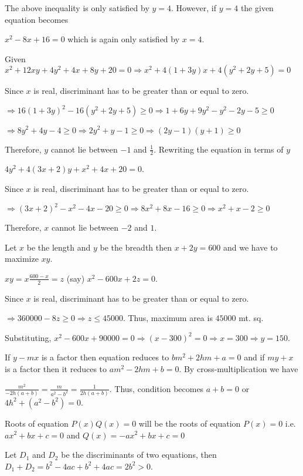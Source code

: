   The above inequality is only satisfied by $y = 4$. However, if $y = 4$ the given equation becomes

  $x^2 - 8x + 16 = 0$ which is again only satisfied by $x = 4$.
\item Given $x^2 + 12xy + 4y^2 + 4x + 8y + 20 = 0\Rightarrow x^2 + 4(1 + 3y)x + 4(y^2 + 2y + 5) = 0$

  Since $x$ is real, discriminant has to be greater than or equal to zero.

  $\Rightarrow 16(1 + 3y)^2 - 16(y^2 + 2y + 5) \ge 0\Rightarrow 1 + 6y + 9y^2 - y^2 - 2y - 5 \ge 0$

  $\Rightarrow 8y^2 + 4y - 4 \ge 0\Rightarrow 2y^2 + y - 1 \ge 0 \Rightarrow (2y - 1)(y + 1) \ge 0$

  Therefore, $y$ cannot lie between $-1$ and $\frac{1}{2}$. Rewriting the equation in terms of $y$

  $4y^2 + 4(3x + 2)y + x^2 + 4x + 20 = 0$.

  Since $x$ is real, discriminant has to be greater than or equal to zero.

  $\Rightarrow (3x + 2)^2 - x^2 - 4x - 20 \ge 0\Rightarrow 8x^2 + 8x - 16 \ge 0 \Rightarrow x^2 + x - 2 \ge
  0$

  Therefore, $x$ cannot lie between $-2$ and $1$.
\item Let $x$ be the length and $y$ be the breadth then $x + 2y = 600$ and we have to maximize $xy$.

  $xy = x\frac{600 - x}{2} = z$ (say) $x^2 - 600x + 2z = 0$.

  Since $x$ is real, discriminant has to be greater than or equal to zero.

  $\Rightarrow 360000 - 8z \ge 0\Rightarrow z \le 45000$. Thus, maximum area is $45000$ mt. sq.

  Substituting, $x^2 - 600x + 90000 = 0\Rightarrow (x - 300)^2 = 0 \Rightarrow x = 300 \Rightarrow y = 150$.
\item If $y - mx$ is a factor then equation reduces to $bm^2 + 2hm + a = 0$ and if $my + x$ is a factor then
  it reduces to $am^2 - 2hm + b = 0$. By cross-multiplication we have

  $\frac{m^2}{-2h(a + b)} = \frac{m}{a^2 - b^2} = \frac{1}{2h(a + b)}$. Thus, condition becomes $a + b = 0$
  or $4h^2 + (a^2 - b^2) = 0$.
\item Roots of equation $P(x)Q(x) = 0$ will be the roots of equation $P(x) = 0$ i.e. $ax^2 + bx + c = 0$
  and $Q(x) = -ax^2 + bx + c = 0$

  Let $D_1$ and $D_2$ be the discriminants of two equations, then $D_1 + D_2 = b^2 - 4ac + b^2 + 4ac = 2b^2
  > 0$.

